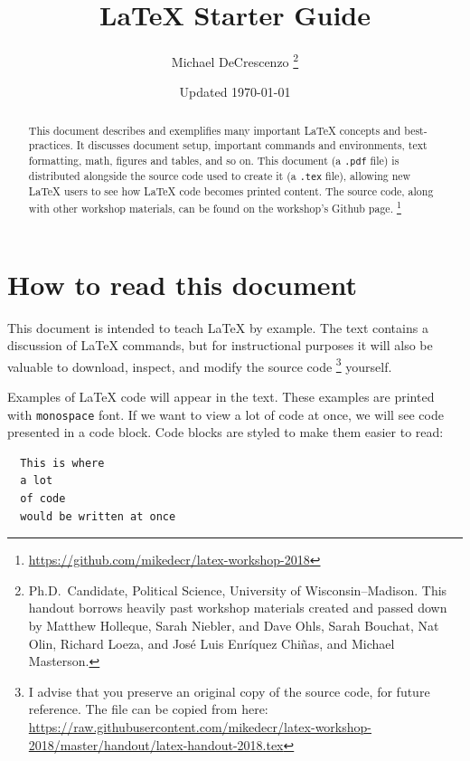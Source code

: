 \documentclass[12pt]{article}
\begin{document}
\title{{\LaTeX} Starter Guide}
\author{Michael DeCrescenzo%
          \thanks{Ph.D.\ Candidate, Political Science, University of Wisconsin--Madison. This handout borrows heavily past workshop materials created and passed down by Matthew Holleque, Sarah Niebler, and Dave Ohls, Sarah Bouchat, Nat Olin, Richard Loeza, and Jos\'e Luis Enr\'iquez Chi\~nas, and Michael Masterson.}}
\date{Updated \today}
\maketitle


\begin{abstract}
  This document describes and exemplifies many important {\LaTeX} concepts and best-practices. It discusses document setup, important commands and environments, text formatting, math, figures and tables, and so on. This document (a \lstinline{.pdf} file) is distributed alongside the source code used to create it (a \lstinline{.tex} file), allowing new {\LaTeX} users to see how {\LaTeX} code becomes printed content. The source code, along with other workshop materials, can be found on the workshop's Github page.%
    \footnote{\url{https://github.com/mikedecr/latex-workshop-2018}}
\end{abstract}

\tableofcontents

\section{How to read this document}

This document is intended to teach {\LaTeX} by example. The text contains a discussion of {\LaTeX} commands, but for instructional purposes it will also be valuable to download, inspect, and modify the source code%
  \footnote{I advise that you preserve an original copy of the source code, for future reference. The file can be copied from here: \url{https://raw.githubusercontent.com/mikedecr/latex-workshop-2018/master/handout/latex-handout-2018.tex}} yourself. 

Examples of {\LaTeX} code will appear in the text. These examples are printed with \lstinline{monospace} font. If we want to view a lot of code at once, we will see code presented in a code block. Code blocks are styled to make them easier to read:

\begin{lstlisting}
  This is where
  a lot
  of code
  would be written at once
\end{lstlisting}
\end{document}
